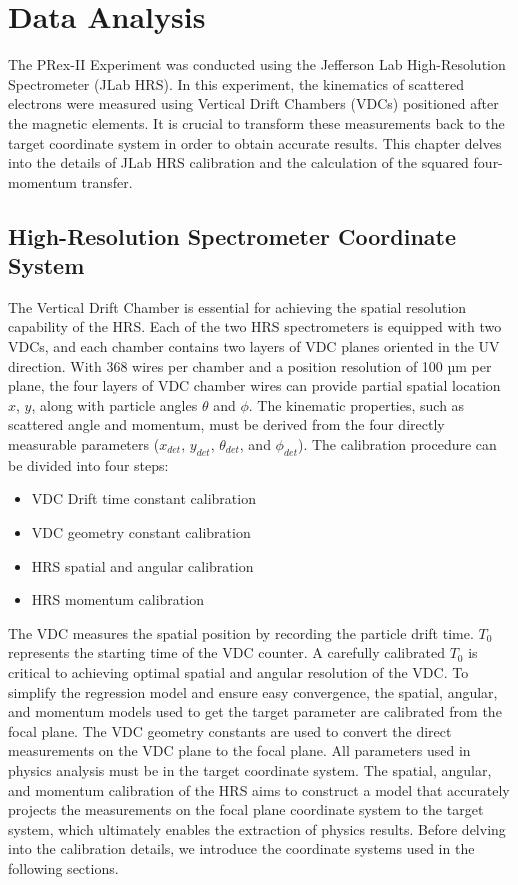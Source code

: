 \chapter{Data Analysis}

The PRex-II Experiment was conducted using the Jefferson Lab High-Resolution Spectrometer (JLab HRS). In this experiment, the kinematics of scattered electrons were measured using Vertical Drift Chambers (VDCs) positioned after the magnetic elements. It is crucial to transform these measurements back to the target coordinate system in order to obtain accurate results. This chapter delves into the details of JLab HRS calibration and the calculation of the squared four-momentum transfer.

\section{High-Resolution Spectrometer Coordinate System}

The Vertical Drift Chamber is essential for achieving the spatial resolution capability of the HRS. Each of the two HRS spectrometers is equipped with two VDCs, and each chamber contains two layers of VDC planes oriented in the UV direction. With 368 wires per chamber and a position resolution of 100 µm per plane, the four layers of VDC chamber wires can provide partial spatial location $x$, $y$, along with particle angles $\theta$ and $\phi$. The kinematic properties, such as scattered angle and momentum, must be derived from the four directly measurable parameters ($x_{det}$, $y_{det}$, $\theta_{det}$, and $\phi_{det}$). The calibration procedure can be divided into four steps:

\begin{itemize}
\item VDC Drift time constant calibration
\item VDC geometry constant calibration
\item HRS spatial and angular calibration
\item HRS momentum calibration
\end{itemize}

The VDC measures the spatial position by recording the particle drift time. $T_0$ represents the starting time of the VDC counter. A carefully calibrated $T_0$ is critical to achieving optimal spatial and angular resolution of the VDC. To simplify the regression model and ensure easy convergence, the spatial, angular, and momentum models used to get the target parameter are calibrated from the focal plane. The VDC geometry constants are used to convert the direct measurements on the VDC plane to the focal plane. All parameters used in physics analysis must be in the target coordinate system. The spatial, angular, and momentum calibration of the HRS aims to construct a model that accurately projects the measurements on the focal plane coordinate system to the target system, which ultimately enables the extraction of physics results. Before delving into the calibration details, we introduce the coordinate systems used in the following sections.

